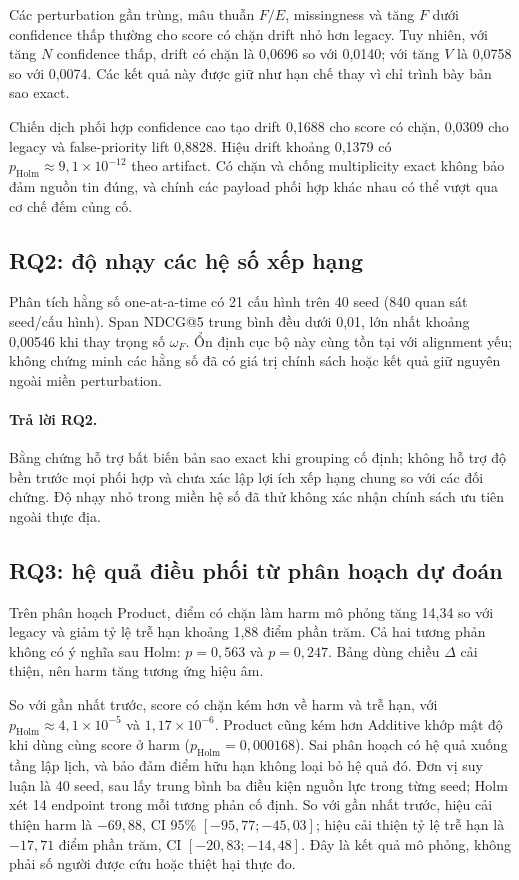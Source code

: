 Các perturbation gần trùng, mâu thuẫn $F/E$, missingness và tăng $F$ dưới confidence thấp thường cho score có chặn drift nhỏ hơn legacy. Tuy nhiên, với tăng $N$ confidence thấp, drift có chặn là 0,0696 so với 0,0140; với tăng $V$ là 0,0758 so với 0,0074. Các kết quả này được giữ như hạn chế thay vì chỉ trình bày bản sao exact.

Chiến dịch phối hợp confidence cao tạo drift 0,1688 cho score có chặn, 0,0309 cho legacy và false-priority lift 0,8828. Hiệu drift khoảng 0,1379 có $p_{\mathrm{Holm}}\approx9{,}1\times10^{-12}$ theo artifact. Có chặn và chống multiplicity exact không bảo đảm nguồn tin đúng, và chính các payload phối hợp khác nhau có thể vượt qua cơ chế đếm củng cố.

\subsection{RQ2: độ nhạy các hệ số xếp hạng}\label{sec:rq2-sensitivity-results}

Phân tích hằng số one-at-a-time có 21 cấu hình trên 40 seed (840 quan sát seed/cấu hình). Span NDCG@5 trung bình đều dưới 0,01, lớn nhất khoảng 0,00546 khi thay trọng số $\omega_F$. Ổn định cục bộ này cùng tồn tại với alignment yếu; không chứng minh các hằng số đã có giá trị chính sách hoặc kết quả giữ nguyên ngoài miền perturbation.

\paragraph{Trả lời RQ2.} Bằng chứng hỗ trợ bất biến bản sao exact khi grouping cố định; không hỗ trợ độ bền trước mọi phối hợp và chưa xác lập lợi ích xếp hạng chung so với các đối chứng. Độ nhạy nhỏ trong miền hệ số đã thử không xác nhận chính sách ưu tiên ngoài thực địa.

\subsection{RQ3: hệ quả điều phối từ phân hoạch dự đoán}

Trên phân hoạch Product, điểm có chặn làm harm mô phỏng tăng 14,34 so với legacy và giảm tỷ lệ trễ hạn khoảng 1,88 điểm phần trăm. Cả hai tương phản không có ý nghĩa sau Holm: $p=0{,}563$ và $p=0{,}247$. Bảng dùng chiều $\Delta$ cải thiện, nên harm tăng tương ứng hiệu âm.

So với gần nhất trước, score có chặn kém hơn về harm và trễ hạn, với $p_{\mathrm{Holm}}\approx4{,}1\times10^{-5}$ và $1{,}17\times10^{-6}$. Product cũng kém hơn Additive khớp mật độ khi dùng cùng score ở harm ($p_{\mathrm{Holm}}=0{,}000168$). Sai phân hoạch có hệ quả xuống tầng lập lịch, và bảo đảm điểm hữu hạn không loại bỏ hệ quả đó.
Đơn vị suy luận là 40 seed, sau lấy trung bình ba điều kiện nguồn lực trong từng seed; Holm xét 14 endpoint trong mỗi tương phản cố định. So với gần nhất trước, hiệu cải thiện harm là $-69{,}88$, CI 95\% $[-95{,}77;-45{,}03]$; hiệu cải thiện tỷ lệ trễ hạn là $-17{,}71$ điểm phần trăm, CI $[-20{,}83;-14{,}48]$. Đây là kết quả mô phỏng, không phải số người được cứu hoặc thiệt hại thực đo.

